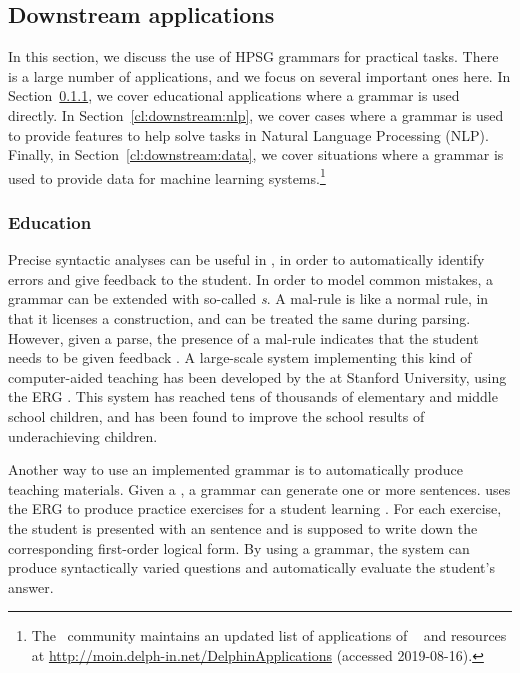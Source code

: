 \documentclass[output=paper
 	        ,biblatex
                ,babelshorthands
                ,newtxmath
                ,draftmode
                ,colorlinks, citecolor=brown
]{langscibook}
\begin{document}
\subsection{Downstream applications}
\label{cl:downstream}

%
In this section, we discuss the use of HPSG grammars for practical tasks.  There is a large number
of applications, and we focus on several important ones here.  In Section~\ref{cl:downstream:edu},
we cover educational applications where a grammar is used directly.  In
Section~\ref{cl:downstream:nlp}, we cover cases where a grammar is used to provide features to help
solve tasks in Natural Language Processing (NLP).  Finally, in Section~\ref{cl:downstream:data}, we
cover situations where a grammar is used to provide data for machine learning systems.\footnote{The
  \delphin\ community maintains an updated list of applications of \delphin\  and
  resources at \url{http://moin.delph-in.net/DelphinApplications} (accessed 2019-08-16).}



\subsubsection{Education}
\label{cl:downstream:edu}

%
Precise syntactic analyses can be useful in ,
in order to automatically identify errors and give feedback to the student.
In order to model common mistakes,
a grammar can be extended with so-called \textit{s}.
A mal-rule is like a normal rule, in that it licenses a construction,
and can be treated the same during parsing. However, given a parse,
the presence of a mal-rule indicates that the student needs to be given feedback
\citep{Ben:Fli:Oep:04,flickinger2013error,morgadodacosta2016error}.
A large-scale system implementing this kind of computer-aided teaching has been developed
by the  at Stanford University,
using the ERG \citep{suppes2014teach}.
This system has reached tens of thousands of elementary and middle school children,
and has been found to improve the school results of underachieving children.

Another way to use an implemented grammar is to automatically produce teaching materials.  Given a , a grammar can generate one or more sentences.  \citet{Flickinger:17} uses the ERG to produce practice exercises for a student learning .  For each exercise, the student is presented with an  sentence and is supposed to write down the corresponding first-order logical form. By using a grammar, the system can produce syntactically varied questions and automatically evaluate the student's answer.%
\end{document}
